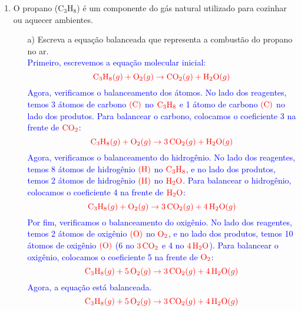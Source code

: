\documentclass[a4paper, 12pt]{article}
\begin{document}
\begin{enumerate}
    \item O propano ($\text{C}_{3}\text{H}_{8}$) é um componente do gás natural utilizado
          para cozinhar ou aquecer ambientes.
          \begin{enumerate}[align=left, labelsep=-0.5em]
              \item[a)] Escreva a equação balanceada que representa a combustão do propano
                    no ar.
                    \\[10pt]
                    \textcolor{blue}{Primeiro, escrevemos a equação molecular inicial:}
                    \[
                        \textcolor{red}{\text{C}_{3}\text{H}_{8} (g) + \text{O}_{2} (g) \rightarrow \text{CO}_{2} (g) + \text{H}_{2}\text{O} (g)}
                    \]
                    \textcolor{blue}{Agora, verificamos o balanceamento dos átomos. No lado dos reagentes, temos 3 átomos de carbono \(\textcolor{red}{(\text{C})}\) no \(\textcolor{red}{\text{C}_{3}\text{H}_{8}}\) e 1 átomo de carbono \(\textcolor{red}{(\text{C})}\) no lado dos produtos. Para balancear o carbono, colocamos o coeficiente 3 na frente de \(\textcolor{red}{\text{CO}_{2}}\):}
                    \[
                        \textcolor{red}{\text{C}_{3}\text{H}_{8} (g) + \text{O}_{2} (g) \rightarrow 3 \, \text{CO}_{2} (g) + \text{H}_{2}\text{O} (g)}
                    \]
                    \textcolor{blue}{Agora, verificamos o balanceamento do hidrogênio. No lado dos reagentes, temos 8 átomos de hidrogênio \(\textcolor{red}{(\text{H})}\) no \(\textcolor{red}{\text{C}_{3}\text{H}_{8}}\), e no lado dos produtos, temos 2 átomos de hidrogênio \(\textcolor{red}{(\text{H})}\) no \(\textcolor{red}{\text{H}_{2}\text{O}}\). Para balancear o hidrogênio, colocamos o coeficiente 4 na frente de \(\textcolor{red}{\text{H}_{2}\text{O}}\):}
                    \[
                        \textcolor{red}{\text{C}_{3}\text{H}_{8} (g) + \text{O}_{2} (g) \rightarrow 3 \, \text{CO}_{2} (g) + 4 \, \text{H}_{2}\text{O} (g)}
                    \]
                    \textcolor{blue}{Por fim, verificamos o balanceamento do oxigênio. No lado dos reagentes, temos 2 átomos de oxigênio \(\textcolor{red}{(\text{O})}\) no \(\textcolor{red}{\text{O}_{2}}\), e no lado dos produtos, temos 10 átomos de oxigênio \(\textcolor{red}{(\text{O})}\) (6 no \(\textcolor{red}{3 \, \text{CO}_{2}}\) e 4 no \(\textcolor{red}{4 \, \text{H}_{2}\text{O}}\)). Para balancear o oxigênio, colocamos o coeficiente 5 na frente de \(\textcolor{red}{\text{O}_{2}}\):}
                    \[
                        \textcolor{red}{\text{C}_{3}\text{H}_{8} (g) + 5 \, \text{O}_{2} (g) \rightarrow 3 \, \text{CO}_{2} (g) + 4 \, \text{H}_{2}\text{O} (g)}
                    \]
                    \textcolor{blue}{Agora, a equação está balanceada.}
                    \[
                        \textcolor{red}{\text{C}_{3}\text{H}_{8} (g) + 5 \, \text{O}_{2} (g) \rightarrow 3 \, \text{CO}_{2} (g) + 4 \, \text{H}_{2}\text{O} (g)}
                    \]


\end{enumerate}
\end{enumerate}
\end{document}
